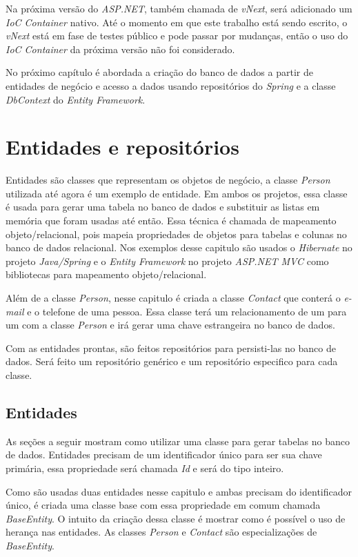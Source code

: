 \documentclass[a4paper,12pt]{article}
\newcommand{\est}[1] {
\textit{#1}}
\newcommand{\classe}[1] {
\textit{#1}}
\newcommand{\sigla}[1] {
\textit{#1}}
\begin{document}
Na próxima versão do \sigla{ASP.NET}, também chamada de \est{vNext}, será adicionado um \est{IoC Container} nativo. Até o momento em que este trabalho está sendo escrito, o \est{vNext} está em fase de testes público e pode passar por mudanças, então o uso do \est{IoC Container} da próxima versão não foi considerado.

No próximo capítulo é abordada a criação do banco de dados a partir de entidades de negócio e acesso a dados usando repositórios do \est{Spring} e a classe \classe{DbContext} do \est{Entity Framework}.

\newpage
\section{Entidades e repositórios}

Entidades são classes que representam os objetos de negócio, a classe \classe{Person} utilizada até agora é um exemplo de entidade. Em ambos os projetos, essa classe é usada para gerar uma tabela no banco de dados e substituir as listas em memória que foram usadas até então. Essa técnica é chamada de mapeamento objeto/relacional, pois mapeia propriedades de objetos para tabelas e colunas no banco de dados relacional. Nos exemplos desse capitulo são usados o \est{Hibernate} no projeto \est{Java/Spring} e o \est{Entity Framework} no projeto \est{ASP.NET MVC} como bibliotecas para mapeamento objeto/relacional.

Além de a classe \classe{Person}, nesse capitulo é criada a classe \classe{Contact} que conterá o \est{e-mail} e o telefone de uma pessoa. Essa classe terá um relacionamento de um para um com a classe \classe{Person} e irá gerar uma chave estrangeira no banco de dados.

Com as entidades prontas, são feitos repositórios para persisti-las no banco de dados. Será feito um repositório genérico e um repositório especifico para cada classe.

\subsection{Entidades}

As seções a seguir mostram como utilizar uma classe para gerar tabelas no banco de dados. Entidades precisam de um identificador único para ser sua chave primária, essa propriedade será chamada \est{Id} e será do tipo inteiro.

Como são usadas duas entidades nesse capitulo e ambas precisam do identificador único, é criada uma classe base com essa propriedade em comum chamada \classe{BaseEntity}. O intuito da criação dessa classe é mostrar como é possível o uso de herança nas entidades. As classes \classe{Person} e \classe{Contact} são especializações de \classe{BaseEntity}.
\end{document}

